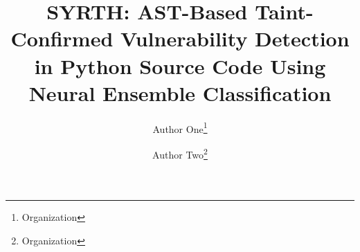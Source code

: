 \documentclass[12pt,a4paper]{article}
\begin{document}
\title{SYRTH: AST-Based Taint-Confirmed Vulnerability Detection in Python Source Code Using Neural Ensemble Classification}

\author{Author One\thanks{Organization} \and Author Two\thanks{Organization}}

\maketitle

%
%
%
%
\end{document}
